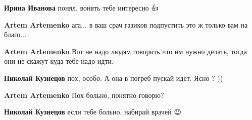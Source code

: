\begin{itemize}
\begin{itemize}
 
\textbf{Ирина Иванова} понял, вонять тебе интересно 👍

 
\textbf{Artem Artemenko} ага... в ваш срач газиков подпустить это ж только вам на благо...

 
\textbf{Artem Artemenko} Вот не надо людям говорить что им нужно делать, тогда они не скажут куда тебе надо идти.

 
\textbf{Николай Кузнецов} пох, особо.
А она в погреб пускай идет.
Ясно ? ))

 
\textbf{Artem Artemenko} Пох больно, понятно говорю?

 
\textbf{Николай Кузнецов} если тебе больно, набирай врачей 😉

 

\end{itemize}
\end{itemize}
